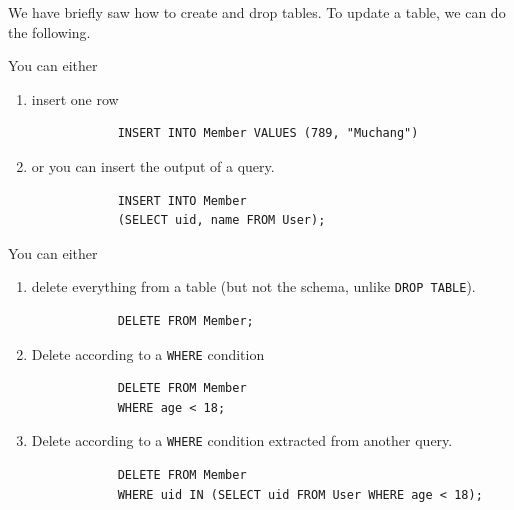     We have briefly saw how to create and drop tables. To update a table, we can do the following. 

    \begin{definition}
      \label{def:insert}
      You can either 
      \begin{enumerate}
        \item insert one row  
          \begin{lstlisting}
            INSERT INTO Member VALUES (789, "Muchang")
          \end{lstlisting} 
        \item or you can insert the output of a query. 
          \begin{lstlisting}
            INSERT INTO Member 
            (SELECT uid, name FROM User); 
          \end{lstlisting}
      \end{enumerate}
    \end{definition}

    \begin{definition}
      \label{def:delete}
      You can either 
      \begin{enumerate}
        \item delete everything from a table (but not the schema, unlike \texttt{DROP TABLE}). 
          \begin{lstlisting}
            DELETE FROM Member; 
          \end{lstlisting}

        \item Delete according to a \texttt{WHERE} condition 
          \begin{lstlisting}
            DELETE FROM Member 
            WHERE age < 18; 
          \end{lstlisting}

        \item Delete according to a \texttt{WHERE} condition extracted from another query. 
          \begin{lstlisting}
            DELETE FROM Member 
            WHERE uid IN (SELECT uid FROM User WHERE age < 18); 
          \end{lstlisting}
          
      \end{enumerate}
    \end{definition}

